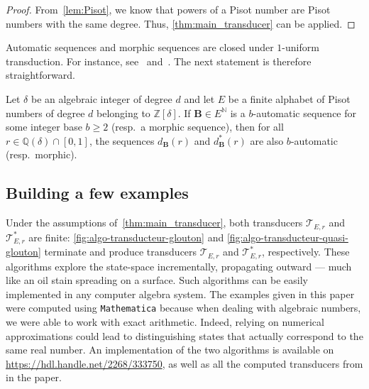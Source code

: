 \documentclass[12pt,reqno]{amsart}
\newcommand{\B}{{\mathbf{B}}}
\begin{document}
\begin{proof}
    From~\cref{lem:Pisot}, we know that powers of a Pisot number are Pisot numbers with the same degree. Thus, \cref{thm:main_transducer} can be applied.
\end{proof}

Automatic sequences and morphic sequences are closed under $1$-uniform transduction. For instance, see~\cite[Theorem 6.9.2]{AS03} and~\cite{Dekking1994}. The next statement is therefore straightforward.

\begin{corollary}
\label{cor:automatic}
 Let $\delta$ be an algebraic integer of degree $d$ and let $E$ be a finite alphabet of Pisot numbers of degree $d$ belonging to $\mathbb{Z}[\delta]$. If $\B\in E^\mathbb{N}$ is a $b$-automatic sequence for some integer base $b\ge 2$ (resp.\ a morphic sequence), then for all $r\in\mathbb{Q}(\delta)\cap [0,1]$, the sequences $d_\B(r)$ and $d_\B^*(r)$ are  also $b$-automatic (resp.\ morphic).
\end{corollary}



\subsection{Building a few examples}

Under the assumptions of~\cref{thm:main_transducer}, both transducers $\mathcal{T}_{E,r}$ and $\mathcal{T}^*_{E,r}$ are finite: \cref{fig:algo-transducteur-glouton} and \cref{fig:algo-transducteur-quasi-glouton} terminate and produce transducers $\mathcal{T}_{E,r}$ and $\mathcal{T}^*_{E,r}$, respectively. These algorithms explore the state-space incrementally, propagating outward --- much like an oil stain spreading on a surface. Such algorithms can be easily implemented in any computer algebra system. The examples given in this paper were computed using {\tt Mathematica} because when dealing with algebraic numbers, we were able to work with exact arithmetic. Indeed, relying on numerical approximations could lead to distinguishing states that actually correspond to the same real number. An implementation of the two algorithms is available on \url{https://hdl.handle.net/2268/333750}, as well as all the computed transducers from in the paper.
\end{document}
